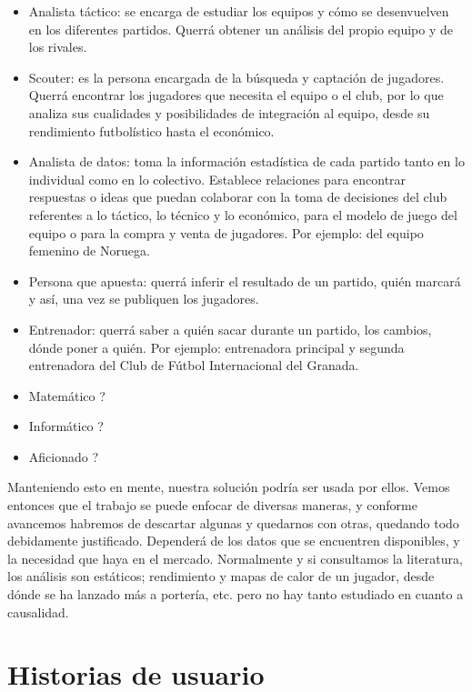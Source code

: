\begin{itemize}
    \item Analista táctico: se encarga de estudiar los equipos y cómo 
    se desenvuelven en los diferentes partidos. Querrá obtener un análisis 
    del propio equipo y de los rivales.
    \item Scouter: es la persona encargada de la búsqueda y captación 
    de jugadores. Querrá encontrar los jugadores que necesita el equipo 
    o el club, por lo que analiza sus cualidades y posibilidades de 
    integración al equipo, desde su rendimiento futbolístico hasta el 
    económico.
    \item Analista de datos: toma la información estadística de 
    cada partido tanto en lo individual como en lo colectivo. 
    Establece relaciones para encontrar respuestas o ideas que 
    puedan colaborar con la toma de decisiones del club referentes 
    a lo táctico, lo técnico y lo económico, para el modelo de 
    juego del equipo o para la compra y venta de jugadores. Por ejemplo: del 
    equipo femenino de Noruega. 
    \item Persona que apuesta: querrá inferir el resultado de un partido, 
    quién marcará y así, una vez se publiquen los jugadores. 
    \item Entrenador: querrá saber a quién sacar durante un partido, los 
    cambios, dónde poner a quién. Por ejemplo: entrenadora principal y 
    segunda entrenadora del Club de Fútbol Internacional del Granada.
    \item Matemático ?
    \item Informático ?
    \item Aficionado  ?
\end{itemize}

Manteniendo esto en mente, nuestra solución 
podría ser usada por ellos. Vemos entonces 
que el trabajo se puede enfocar de diversas 
maneras, y conforme avancemos habremos de descartar algunas y 
quedarnos con otras, quedando todo debidamente justificado. Dependerá de los 
datos que se encuentren disponibles, y la necesidad que haya en el mercado. 
Normalmente y si consultamos la literatura, los análisis son estáticos; 
rendimiento y mapas de calor de un jugador, desde dónde se ha lanzado más 
a portería, etc. pero no hay tanto estudiado en cuanto a causalidad.

\section{Historias de usuario}  


